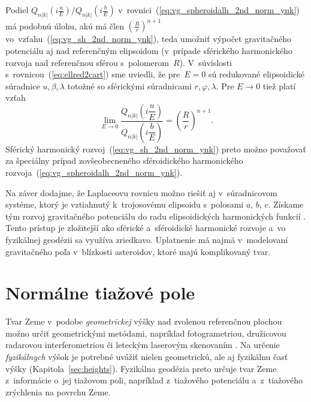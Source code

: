 \documentclass[a4paper, 12pt]{book}
\begin{document}
Podiel $Q_{n|k|}\left( i \frac{u}{E} \right) \slash Q_{n|k|}\left( 
i \frac{b}{E} \right)$ v~rovnici~(\ref{eq:vg_spheroidalh_2nd_norm_ynk}) má 
podobnú úlohu, akú má člen $\left( \frac{R}{r} \right)^{n + 1}$ 
vo~vzťahu~(\ref{eq:vg_sh_2nd_norm_ynk}), teda umožniť výpočet gravitačného 
potenciálu aj nad referenčným elipsoidom (v~prípade sférického harmonického 
rozvoja nad referenčnou sférou s~polomerom~$R$).  V~súvislosti 
s~rovnicou~(\ref{eq:ellred2cart}) sme uviedli, že pre~$E = 0$ sú redukované 
elipsoidické súradnice $u, \beta, \lambda$ totožné so sférickými súradnicami 
$r, \varphi, \lambda$.  Pre $E \rightarrow 0$ tiež platí vzťah 
\parencite{MoritzPhysicalGeodesy}
%
\begin{equation}
\lim_{E \rightarrow 0} \frac{Q_{n|k|}\left( i \dfrac{u}{E} 
\right)}{Q_{n|k|}\left( i \dfrac{b}{E} \right)} = \left( \frac{R}{r} \right)^{n 
+ 1}{.}
\end{equation}
%
Sférický harmonický rozvoj~(\ref{eq:vg_sh_2nd_norm_ynk}) preto možno považovať 
za špeciálny prípad zovšeobecneného sféroidického harmonického 
rozvoja~(\ref{eq:vg_spheroidalh_2nd_norm_ynk}).

Na záver dodajme, že Laplaceovu rovnicu možno riešiť aj v~súradnicovom systéme, 
ktorý je vztiahnutý k~trojosovému elipsoidu s~polosami $a$, $b$, $c$.  Získame 
tým rozvoj gravitačného potenciálu do radu elipsoidických harmonických funkcií 
\parencite[napríklad][]{Garmier2001,Hu2015,Reimond2016}.  Tento prístup je 
zložitejší ako sférické a~sféroidické harmonické rozvoje a~vo fyzikálnej 
geodézii sa využíva zriedkavo.  Uplatnenie má najmä v~modelovaní gravitačného 
poľa v~blízkosti asteroidov, ktoré majú komplikovaný tvar.










\chapter{Normálne tiažové pole}
\label{sec:normal_gravity_field}

Tvar Zeme v~podobe \emph{geometrickej} výšky nad zvolenou referenčnou plochou 
možno určiť geometrickými metódami, napríklad fotogrametriou, družicovou 
radarovou interferometriou či leteckým laserovým skenovaním \parencite[pozri 
napríklad][]{Hirt2014c}.  Na určenie \emph{fyzikálnych} výšok je potrebné 
uvážiť nielen geometrickú, ale aj fyzikálnu časť výšky 
(Kapitola~\ref{sec:heights}).  Fyzikálna geodézia preto určuje tvar Zeme 
z~informácie o~jej tiažovom poli, napríklad z~tiažového potenciálu 
a~z~tiažového zrýchlenia na povrchu Zeme.
\end{document}
